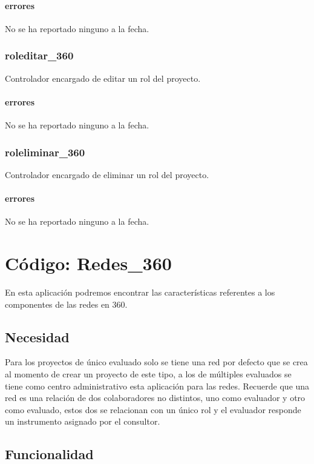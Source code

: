 \documentclass[10pt,a4paper]{book}
\begin{document}
	\subsubsection{errores}
	No se ha reportado ninguno a la fecha.
	
	\subsection{roleditar\_360}
	Controlador encargado de editar un rol del proyecto.
	\subsubsection{errores}
	No se ha reportado ninguno a la fecha.
	
	\subsection{roleliminar\_360}
	Controlador encargado de eliminar un rol del proyecto.
	\subsubsection{errores}
	No se ha reportado ninguno a la fecha.


	\chapter{Código: Redes\_360}
	
	En esta aplicación podremos encontrar las características referentes a los componentes de las redes en 360.
	
	\section{Necesidad}
	
	Para los proyectos de único evaluado solo se tiene una red por defecto que se crea al momento de crear un proyecto de este tipo, a los de múltiples evaluados se tiene como centro administrativo esta aplicación para las redes. Recuerde que una red es una relación de dos colaboradores no distintos, uno como evaluador y otro como evaluado, estos dos se relacionan con un único rol y el evaluador responde un instrumento asignado por el consultor.
	
	\section{Funcionalidad}
\end{document}
